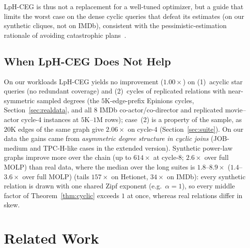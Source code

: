 \documentclass[sigconf, nonacm, acmthm=false]{acmart}
\begin{document}
LpH-CEG is thus not a replacement for a
well-tuned optimizer, but a guide that limits the worst case on the
dense cyclic queries that defeat its estimates (on our synthetic cliques,
not on IMDb), consistent with the pessimistic-estimation rationale of avoiding catastrophic plans~\cite{cai2019pessimistic}.

\subsection{When LpH-CEG Does Not Help}
\label{sec:noimprove}

On our workloads LpH-CEG yields no improvement ($1.00\times$) on
(1)~acyclic star queries (no redundant coverage) and (2)~cycles of replicated relations with
near-symmetric sampled degrees (the $5$K-edge-prefix Epinions cycles,
Section~\ref{sec:realdata}, and all $8$ IMDb co-actor/co-director and
replicated movie--actor cycle-$4$ instances at $5$K--$1$M rows); case~(2) is a property of the sample, as $20$K
edges of the same graph give $2.06\times$ on cycle-4
(Section~\ref{sec:suite}). On our data the gains came from \emph{asymmetric degree structure in cyclic joins} (JOB-medium and TPC-H-like cases in the extended version). Synthetic power-law graphs improve more over the chain (up to
$614\times$ at cycle-8; $2.6\times$ over full MOLP) than real data, where the median over the long
suites is $1.8$--$8.9\times$ ($1.4$--$3.6\times$ over full MOLP) (tails $157\times$ on Hetionet, $34\times$
on IMDb): every synthetic relation is drawn with one shared Zipf exponent (e.g.\ $\alpha{=}1$), so every middle factor of Theorem~\ref{thm:cyclic} exceeds $1$ at once, whereas real relations differ in skew.

\section{Related Work}
\label{sec:related}
\end{document}
